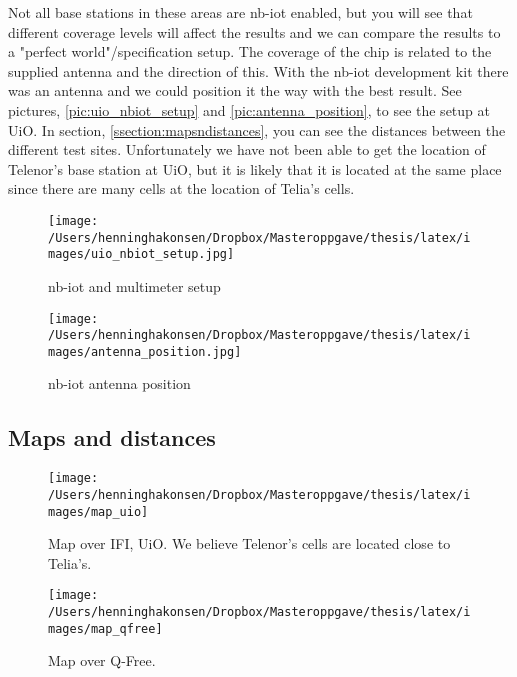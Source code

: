 \documentclass[USenglish]{ifimaster}  %
\begin{document}
Not all base stations in these areas are \acrshort{nb-iot} enabled, but you will see that different coverage levels will affect the results and we can compare the results to a "perfect world"/specification setup. The coverage of the chip is related to the supplied antenna and the direction of this. With the \acrshort{nb-iot} development kit there was an antenna and we could position it the way with the best result. See pictures, \vref{pic:uio_nbiot_setup} and \vref{pic:antenna_position}, to see the setup at UiO. In section, \vref{ssection:mapsndistances}, you can see the distances between the different test sites. Unfortunately we have not been able to get the location of Telenor's base station at UiO, but it is likely that it is located at the same place since there are many cells at the location of Telia's cells.

\begin{figure}[H]
  \centering\texttt{[image: /Users/henninghakonsen/Dropbox/Masteroppgave/thesis/latex/images/uio\_nbiot\_setup.jpg]}
  \caption{\acrshort{nb-iot} and multimeter setup}
  \label{pic:uio_nbiot_setup}
\end{figure}

\begin{figure}[H]
  \centering\texttt{[image: /Users/henninghakonsen/Dropbox/Masteroppgave/thesis/latex/images/antenna\_position.jpg]}
  \caption{\acrshort{nb-iot} antenna position}
  \label{pic:antenna_position}
\end{figure}

\subsection{Maps and distances} \label{ssection:mapsndistances}
\begin{figure}[H]
  \centering\texttt{[image: /Users/henninghakonsen/Dropbox/Masteroppgave/thesis/latex/images/map\_uio]}
  \caption{Map over IFI, UiO. We believe Telenor's cells are located close to Telia's. \cite{online:finnsenderen}}
  \label{figure:map_uio}
\end{figure}

\begin{figure}[H]
  \centering\texttt{[image: /Users/henninghakonsen/Dropbox/Masteroppgave/thesis/latex/images/map\_qfree]}
  \caption{Map over Q-Free.}
  \label{figure:map_qfree}
\end{figure}
\end{document}
